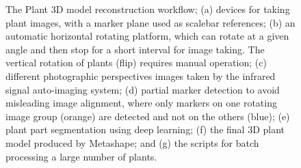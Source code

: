 \begin{figure}[htb]
  \begin{center}
  \end{center}
  \caption[The plant 3D model reconstruction workflow]{
    The Plant 3D model reconstruction workflow; (a) devices for taking plant images, with a marker plane used as scalebar references; (b) an automatic horizontal rotating platform, which can rotate at a given angle and then stop for a short interval for image taking. The vertical rotation of plants (flip) requires manual operation; (c) different photographic perspectives images taken by the infrared signal auto-imaging system; (d) partial marker detection to avoid misleading image alignment, where only markers on one rotating image group (orange) are detected and not on the others (blue); (e) plant part segmentation using deep learning; (f) the final 3D plant model produced by Metashape; and (g) the scripts for batch processing a large number of plants.
  }
  \label{fig:des_img_recons}
\end{figure}